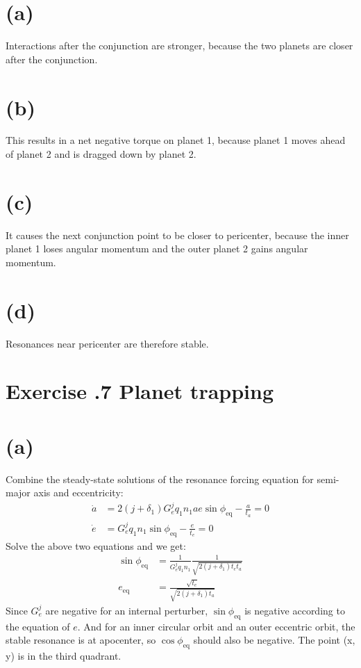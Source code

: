 \documentclass[a4paper,12pt]{article}
\begin{document}
\section*{(a)} Interactions after the conjunction are stronger, because the two planets are closer after the conjunction.
\section*{(b)} This results in a net negative torque on planet 1, because planet 1 moves ahead of planet 2 and is dragged down by planet 2.
\section*{(c)} It causes the next conjunction point to be closer to pericenter, because the inner planet 1 loses angular momentum and the outer planet 2 gains angular momentum.
\section*{(d)} Resonances near pericenter are therefore stable.

\section*{\textbf{Exercise \uppercase\expandafter{}.7 Planet trapping}}
\section*{(a)}
Combine the steady-state solutions of the resonance forcing equation for semi-major axis and 
eccentricity:
\begin{align*}
    \dot{a} &= 2(j+\delta_1) G_e^j q_1 n_1 a e \sin \phi_{\text{eq}} - \frac{a}{t_a} = 0\\
    \dot{e} &= G_e^j q_1 n_1 \sin \phi_{\text{eq}} - \frac{e}{t_e} = 0
\end{align*}
Solve the above two equations and we get:
\begin{align*}
    \sin\phi_{\text{eq}} &= \frac{1}{G_e^j q_1 n_1} \frac{1}{\sqrt{2(j+\delta_1)t_e t_a}}\\
    e_{\text{eq}} &= \frac{\sqrt{t_e}}{\sqrt{2(j+\delta_1)t_a}}
\end{align*}
Since $G_e^j$ are negative for an internal perturber, $\sin \phi_{\text{eq}}$ is negative according to the equation of $e$.
And for an inner circular orbit and an outer eccentric orbit, the stable resonance is at apocenter, so 
$\cos \phi_{\text{eq}}$ should also be negative. The point (x, y) is in the third quadrant.
\end{document}
